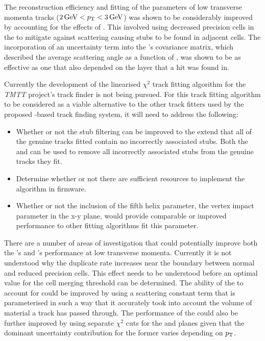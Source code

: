 The reconstruction efficiency and fitting of the parameters of low transverse momenta tracks ($2\,\text{Ge\hspace{-.08em}V} < p_{\mathrm{T}} < 3\,\text{Ge\hspace{-.08em}V}$) was shown to be considerably improved by accounting for the effects of \MS.
This involved using decreased precision cells in the \HT to mitigate against scattering causing stubs to be found in adjacent \HT cells.
The incorporation of an uncertainty term into the \KF's covariance matrix, which described the average scattering angle as a function of \pT, was shown to be as effective as one that also depended on the layer that a hit was found in.

Currently the development of the linearised $\chi^{2}$ track fitting algorithm for the \emph{TMTT} project's track finder is not being pursued.
For this track fitting algorithm to be considered as a viable alternative to the other track fitters used by the proposed \HT-based track finding system, it will need to address the following:

\begin{itemize}
\item Whether or not the stub filtering can be improved to the extend that all of the genuine tracks fitted contain no incorrectly associated stubs. Both the \KF and \LR can be used to remove all incorrectly associated stubs from the genuine tracks they fit. 
\item Determine whether or not there are sufficient resources to implement the algorithm in firmware.
\item Whether or not the inclusion of the fifth helix parameter, the vertex impact parameter in the x-y plane, would provide comparable or improved performance to other fitting algorithms fit this parameter.
\end{itemize}

There are a number of areas of investigation that could potentially improve both the \HT's and \KF's performance at low  transverse momenta.
Currently it is not understood why the duplicate rate increases near the boundary between normal and reduced precision \HT cells.
This effect needs to be understood before an optimal value for the cell merging threshold can be determined.
The ability of the \KF to account for \MS could be improved by using a scattering constant term that is parameterised in such a way that it accurately took into account the volume of material a track has passed through.
The performance of the \KF could also be further improved by using separate \KF $\chi^{2}$ cuts for the \rphi and \rz planes given that the dominant uncertainty contribution for the former varies depending on $p_{\mathrm{T}}$.